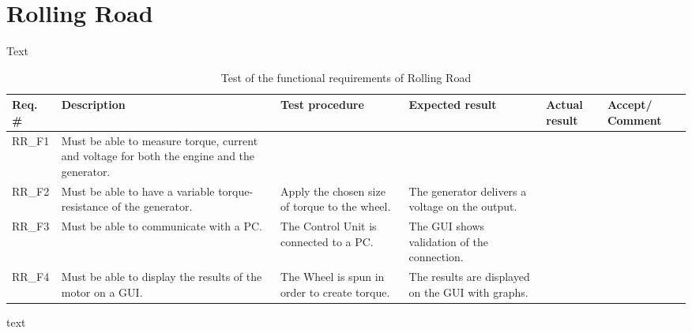 \section{Rolling Road}
Text

\begin{table}[h!]
	\centering
	\label{my-label}
	\begin{tabular}{|p{1.5 cm}|p{2.1 cm}|p{2.1 cm}|p{2.1 cm}|p{2.1 cm}|p{2.1 cm}|}
		\hline
		\textbf{Req. \#} & \textbf{Description}                                                                                & \textbf{Test procedure}                                         & \textbf{Expected result}                                   & \textbf{Actual result} & \textbf{Accept/ Comment} \\ \hline
		RR\_F1  & Must be able to measure torque, current and voltage for both the engine and the generator. &                                               &                                                   &               &                \\ \hline
		RR\_F2  & Must be able to have a variable torque-resistance of the generator.                        & Apply the chosen size of torque to the wheel. & The generator delivers a voltage on the output.   &               &                \\ \hline
		RR\_F3  & Must be able to communicate with a PC.                                                     & The Control Unit is connected to a PC.        & The GUI shows validation of the connection.       &               &                \\ \hline
		RR\_F4  & Must be able to display the results of the motor on a GUI.                                 & The Wheel is spun in order to create torque.  & The results are displayed on the GUI with graphs. &               &                \\ \hline
	\end{tabular}
	\caption{Test of the functional requirements of Rolling Road}
\end{table}

text

